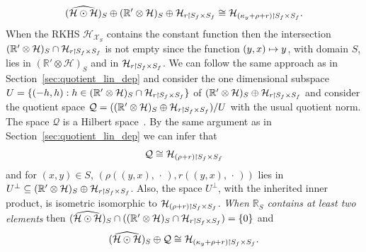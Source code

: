 \documentclass[10pt]{amsart}
\theoremstyle{definition}\newtheorem{defi}[theo]{Definition}\newtheorem{rema}[theo]{Remark}\newtheorem{exam}[theo]{Example}\newtheorem{exem}[theo]{Example}\newtheorem{nota}[theo]{Notation}
\theoremstyle{remark}
\newcommand{\R}{\mathbb{R}}
\newcommand{\dR}{{\R'}}
\newcommand{\X}{\mathcal{X}}
\newcommand{\cH}{\mathcal{H}}
\newcommand{\clQ}{\mathcal{Q}}
\newcommand*{\mk}{\mkern -1mu}
\let\oldmapsto\mapsto
\renewcommand*{\mapsto}{\mathchoice{\longmapsto}{\oldmapsto}{\oldmapsto}{\oldmapsto}}
\begin{document}
\[
(\widehat{\cH \odot \cH})_S \oplus (\dR \otimes \cH)_S \oplus \cH_{r\mk\upharpoonright\mk S_f \times S_f} \cong
\cH_{(\kappa_y + \rho + r) \mk\upharpoonright\mk S_f \times S_f}.
\]
When the RKHS $\cH_{\X_S}$ contains the constant function then the intersection $(\R' \otimes \cH)_S \cap \cH_{r \mk\upharpoonright\mk S_f \times S_f}$ is not empty since the function $(y,x) \mapsto y$, with domain $S$, lies in $(\R' \otimes \cH)_S$ and in $\cH_{r\mk\upharpoonright\mk S_f \times S_f}$. We can follow the same approach as in Section~\ref{sec:quotient_lin_dep} and consider the one dimensional subspace $U = \{(-h,h) : h \in (\R' \otimes \cH)_S \cap
\cH_{r \mk\upharpoonright\mk S_f \times S_f}\}$ of $(\dR \otimes \cH)_S \oplus \cH_{r\mk\upharpoonright\mk S_f \times S_f}$ and consider the quotient space $\clQ = ((\dR \otimes \cH)_S \oplus \cH_{r\mk\upharpoonright\mk S_f \times S_f}) / U$ with the usual quotient norm. The space $\clQ$ is a Hilbert space~\cite[Section~III.4]{REED72}. By the same argument as in Section~\ref{sec:quotient_lin_dep} we can infer that
\[
\clQ \cong \cH_{(\rho + r)\mk\upharpoonright\mk S_f \times S_f}
\]
and for $(x,y) \in S$, $(\rho((y,x),\,\cdot\,), r((y,x),\,\cdot\,))$ lies in $U^\perp \subseteq (\dR \otimes \cH)_S \oplus \cH_{r\mk\upharpoonright\mk S_f \times S_f}$. Also, the space $U^\perp$, with the inherited inner product, is isometric isomorphic to $\cH_{(\rho + r)\mk\upharpoonright\mk S_f \times S_f}$.
\emph{When $\R_S$ contains at least two elements} then $(\widehat{\cH \odot \cH})_S \cap ((\dR \otimes \cH)_S \cap \cH_{r\mk\upharpoonright\mk S_f \times S_f}) = \{0\}$ and
\[
(\widehat{\cH \odot \cH})_S \oplus \clQ \cong \cH_{(\kappa_y + \rho + r)\mk\upharpoonright\mk S_f \times S_f}.
\]
\end{document}
